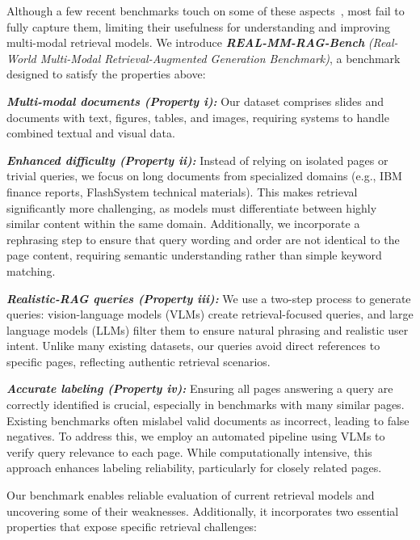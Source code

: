\vspace{0.1cm}
\noindent
Although a few recent benchmarks touch on some of these aspects~\citep{faysse2024colpali,ma2024unifying,ma2024mmlongbench}, most fail to fully capture them, limiting their usefulness for understanding and improving multi-modal retrieval models. We introduce \emph{\textbf{REAL-MM-RAG-Bench}} \emph{(Real-World Multi-Modal Retrieval-Augmented Generation Benchmark)}, a benchmark designed to satisfy the properties above:

\emph{\textbf{Multi-modal documents (Property i):}} Our dataset comprises slides and documents with text, figures, tables, and images, requiring systems to handle combined textual and visual data.

\emph{\textbf{Enhanced difficulty (Property ii):}} Instead of relying on isolated pages or trivial queries, we focus on long documents from specialized domains (e.g., IBM finance reports, FlashSystem technical materials). 
This makes retrieval significantly more challenging, as models must differentiate between highly similar content within the same domain. Additionally, we incorporate a rephrasing step to ensure that query wording and order are not identical to the page content, requiring semantic understanding rather than simple keyword matching.

\emph{\textbf{Realistic-RAG queries (Property iii):}} We use a two-step process to generate queries: vision-language models (VLMs) create retrieval-focused queries, and large language models (LLMs) filter them to ensure natural phrasing and realistic user intent. Unlike many existing datasets, our queries avoid direct references to specific pages, reflecting authentic retrieval scenarios. 

\emph{\textbf{Accurate labeling (Property iv):}} Ensuring all pages answering a query are correctly identified is crucial, especially in benchmarks with many similar pages. Existing benchmarks often mislabel valid documents as incorrect, leading to false negatives. To address this, we employ an automated pipeline using VLMs to verify query relevance to each page. While computationally intensive, this approach enhances labeling reliability, particularly for closely related pages.

\vspace{0.12cm}
\noindent
Our benchmark enables reliable evaluation of current retrieval models and uncovering some of their weaknesses. Additionally, it incorporates two essential properties that expose specific retrieval challenges: 

